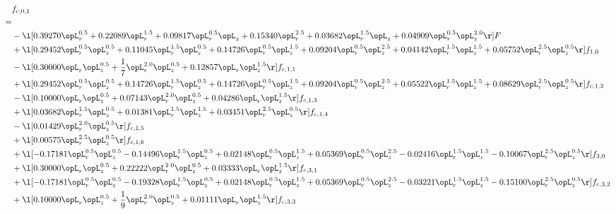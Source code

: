 \begin{alignat}{2} 
\label{eq:f_01_1} 
& f_{c,0,1} \nonumber \\ 
 = \\ 
& - \l[  0.39270 \opL_r^{0.5} +  0.22089 \opL_r^{1.5} +  0.09817 \opL_r^{0.5} \opL_z +  0.15340 \opL_r^{2.5} +  0.03682 \opL_r^{1.5} \opL_z +  0.04909 \opL_r^{0.5} \opL_z^{2.0}  \r] F \nonumber \\ 
& + \l[  0.29452 \opL_r^{0.5} \opL_z^{0.5} +  0.11045 \opL_r^{1.5} \opL_z^{0.5} +  0.14726 \opL_r^{0.5} \opL_z^{1.5} +  0.09204 \opL_r^{0.5} \opL_z^{2.5} +  0.04142 \opL_r^{1.5} \opL_z^{1.5} +  0.05752 \opL_r^{2.5} \opL_z^{0.5}  \r] f_{1,0} \nonumber \\ 
& - \l[  0.30000 \opL_r \opL_z^{0.5} + \frac{1}{7} \opL_r^{2.0} \opL_z^{0.5} +  0.12857 \opL_r \opL_z^{1.5}  \r] f_{c,1,1} \nonumber \\ 
& + \l[  0.29452 \opL_r^{0.5} \opL_z^{0.5} +  0.14726 \opL_r^{1.5} \opL_z^{0.5} +  0.14726 \opL_r^{0.5} \opL_z^{1.5} +  0.09204 \opL_r^{0.5} \opL_z^{2.5} +  0.05522 \opL_r^{1.5} \opL_z^{1.5} +  0.08629 \opL_r^{2.5} \opL_z^{0.5}  \r] f_{c,1,2} \nonumber \\ 
& - \l[  0.10000 \opL_r \opL_z^{0.5} +  0.07143 \opL_r^{2.0} \opL_z^{0.5} +  0.04286 \opL_r \opL_z^{1.5}  \r] f_{c,1,3} \nonumber \\ 
& + \l[  0.03682 \opL_r^{1.5} \opL_z^{0.5} +  0.01381 \opL_r^{1.5} \opL_z^{1.5} +  0.03451 \opL_r^{2.5} \opL_z^{0.5}  \r] f_{c,1,4} \nonumber \\ 
& - \l[  0.01429 \opL_r^{2.0} \opL_z^{0.5}  \r] f_{c,1,5} \nonumber \\ 
& + \l[  0.00575 \opL_r^{2.5} \opL_z^{0.5}  \r] f_{c,1,6} \nonumber \\ 
& + \l[  -0.17181 \opL_r^{0.5} \opL_z^{0.5}   -0.14496 \opL_r^{1.5} \opL_z^{0.5} +  0.02148 \opL_r^{0.5} \opL_z^{1.5} +  0.05369 \opL_r^{0.5} \opL_z^{2.5}   -0.02416 \opL_r^{1.5} \opL_z^{1.5}   -0.10067 \opL_r^{2.5} \opL_z^{0.5}  \r] f_{3,0} \nonumber \\ 
& + \l[  0.30000 \opL_r \opL_z^{0.5} +  0.22222 \opL_r^{2.0} \opL_z^{0.5} +  0.03333 \opL_r \opL_z^{1.5}  \r] f_{c,3,1} \nonumber \\ 
& + \l[  -0.17181 \opL_r^{0.5} \opL_z^{0.5}   -0.19328 \opL_r^{1.5} \opL_z^{0.5} +  0.02148 \opL_r^{0.5} \opL_z^{1.5} +  0.05369 \opL_r^{0.5} \opL_z^{2.5}   -0.03221 \opL_r^{1.5} \opL_z^{1.5}   -0.15100 \opL_r^{2.5} \opL_z^{0.5}  \r] f_{c,3,2} \nonumber \\ 
& + \l[  0.10000 \opL_r \opL_z^{0.5} + \frac{1}{9} \opL_r^{2.0} \opL_z^{0.5} +  0.01111 \opL_r \opL_z^{1.5}  \r] f_{c,3,3} \nonumber \\ 

\end{alignat}
